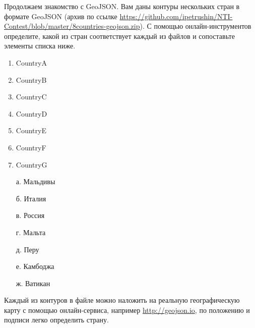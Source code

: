 
Продолжаем знакомство с GeoJSON. Вам даны контуры нескольких стран в формате GeoJSON (архив по ссылке \url{https://github.com/ipetrushin/NTI-Contest/blob/master/8countries-geojson.zip}). 
С помощью онлайн-инструментов определите, какой из стран соответствует каждый из файлов и сопоставьте элементы списка ниже.

\begin{multicols}{2}
    {
        \begin{enumerate}
            \item CountryA
            \item CountryB
            \item CountryC
            \item CountryD
            \item CountryE
            \item CountryF
            \item CountryG
        \end{enumerate}
    }

    {
        \begin{enumerate}
            \item[а.] Мальдивы
            \item[б.] Италия
            \item[в.] Россия
            \item[г.] Мальта
            \item[д.] Перу
            \item[е.] Камбоджа
            \item[ж.] Ватикан
        \end{enumerate}
    }
    
\end{multicols}

\explanationSection

Каждый из контуров  в файле можно наложить на реальную географическую карту с помощью онлайн-сервиса, например \url{http://geojson.io}, по положению и подписи легко определить страну.

